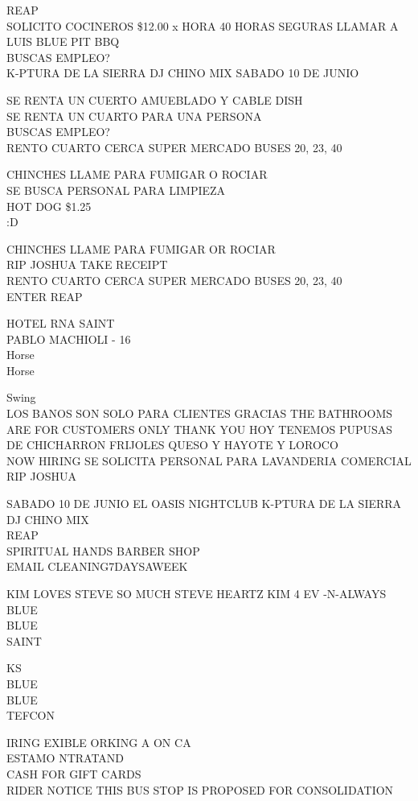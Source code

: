 \documentclass[10pt,letterpaper]{article}
\begin{document}
REAP\\
SOLICITO COCINEROS \$12.00 x HORA 40 HORAS SEGURAS LLAMAR A LUIS BLUE PIT BBQ\\
BUSCAS EMPLEO?\\
K{-}PTURA DE LA SIERRA DJ CHINO MIX SABADO 10 DE JUNIO

SE RENTA UN CUERTO AMUEBLADO Y CABLE DISH\\
SE RENTA UN CUARTO PARA UNA PERSONA\\
BUSCAS EMPLEO?\\
RENTO CUARTO CERCA SUPER MERCADO BUSES 20, 23, 40

CHINCHES LLAME PARA FUMIGAR O ROCIAR\\
SE BUSCA PERSONAL PARA LIMPIEZA\\
HOT DOG \$1.25\\
:D

CHINCHES LLAME PARA FUMIGAR OR ROCIAR\\
RIP JOSHUA TAKE RECEIPT\\
RENTO CUARTO CERCA SUPER MERCADO BUSES 20, 23, 40\\
ENTER REAP

HOTEL RNA SAINT\\
PABLO MACHIOLI {-} 16\\
Horse\\
Horse

Swing\\
LOS BANOS SON SOLO PARA CLIENTES GRACIAS THE BATHROOMS ARE FOR CUSTOMERS ONLY THANK YOU HOY TENEMOS PUPUSAS DE CHICHARRON FRIJOLES QUESO Y HAYOTE Y LOROCO\\
NOW HIRING SE SOLICITA PERSONAL PARA LAVANDERIA COMERCIAL\\
RIP JOSHUA

SABADO 10 DE JUNIO EL OASIS NIGHTCLUB K{-}PTURA DE LA SIERRA DJ CHINO MIX\\
REAP\\
SPIRITUAL HANDS BARBER SHOP\\
EMAIL CLEANING7DAYSAWEEK

KIM LOVES STEVE SO MUCH STEVE HEARTZ KIM 4 EV {-}N{-}ALWAYS\\
BLUE\\
BLUE\\
SAINT

KS\\
BLUE\\
BLUE\\
TEFCON

IRING EXIBLE ORKING A ON CA\\
ESTAMO NTRATAND\\
CASH FOR GIFT CARDS\\
RIDER NOTICE THIS BUS STOP IS PROPOSED FOR CONSOLIDATION
\end{document}
